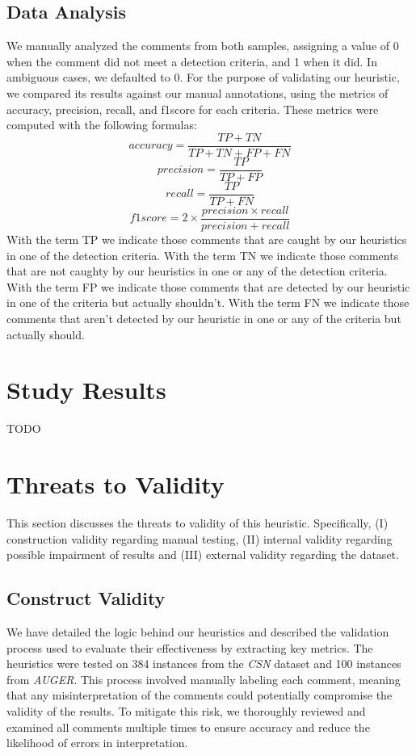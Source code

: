 \subsection{Data Analysis}
We manually analyzed the comments from both samples, assigning a value of 0 when the comment did not meet a detection criteria, and 1 when it did. In ambiguous cases, we defaulted to 0. For the purpose of validating our heuristic, we compared its results against our manual annotations, using the metrics of accuracy, precision, recall, and f1score for each criteria. These metrics were computed with the following formulas:
\begin{equation*}
	accuracy = \frac{TP + TN}{TP + TN + FP + FN}		
\end{equation*}
\begin{equation*}
	precision = \frac{TP}{TP + FP}
\end{equation*}
\begin{equation*}
	recall = \frac{TP}{TP + FN}
\end{equation*}
\begin{equation*}
	f1score = 2 \times \frac{precision \times recall}{precision + recall}
\end{equation*}
With the term TP we indicate those comments that are caught by our heuristics in one of the detection criteria. With the term TN we indicate those comments that are not caughty by our heuristics in one or any of the detection criteria. With the term FP we indicate those comments that are detected by our heuristic in one of the criteria but actually shouldn't. With the term FN we indicate those comments that aren't detected by our heuristic in one or any of the criteria but actually should.

\section{Study Results}
TODO

\section{Threats to Validity}
This section discusses the threats to validity of this heuristic. Specifically, (I) construction validity regarding manual testing, (II) internal validity regarding possible impairment of results and (III) external validity regarding the dataset.

\subsection{Construct Validity}
We have detailed the logic behind our heuristics and described the validation process used to evaluate their effectiveness by extracting key metrics. The heuristics were tested on 384 instances from the \textit{CSN} dataset and 100 instances from \textit{AUGER}. This process involved manually labeling each comment, meaning that any misinterpretation of the comments could potentially compromise the validity of the results. To mitigate this risk, we thoroughly reviewed and examined all comments multiple times to ensure accuracy and reduce the likelihood of errors in interpretation.

